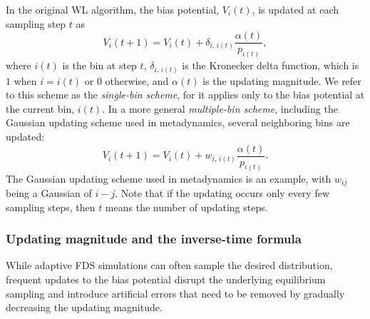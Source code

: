 \documentclass[reprint, superscriptaddress, floatfix]{revtex4-1}
\begin{document}
%
In the original WL algorithm\cite{wang2001, *wang2001pre},
the bias potential, $V_i(t)$, is updated
at each sampling step $t$ as
%
\begin{equation}
  V_i(t+1)
  =
  V_i(t)
  +
  \delta_{i, \, i(t)}
  \frac{ \alpha(t) } { p_{i(t)} }
  ,
\label{eq:wl_update}
\end{equation}
%
where $i(t)$ is the bin at step $t$,
$\delta_{i, \, i(t)}$ is the Kronecker delta function,
which is $1$ when $i = i(t)$ or $0$ otherwise,
and $\alpha(t)$ is the updating magnitude.
%
We refer to this scheme as the \emph{single-bin scheme},
for it applies only to the bias potential
at the current bin, $i(t)$.
%
In a more general \emph{multiple-bin scheme},
including the Gaussian updating scheme
used in metadynamics,
several neighboring bins are updated:
%
\begin{equation}
  V_i(t+1)
  =
  V_i(t)
  +
  w_{i, \, i(t)}
  \frac{ \alpha(t) }
       { p_{i(t)} }
  .
  \label{eq:mbin_update}
\end{equation}
%
The Gaussian updating scheme used in metadynamics
is an example, with $w_{ij}$ being a Gaussian of $i-j$.
%
Note that if the updating occurs
only every few sampling steps,
then $t$ means the number of updating steps.



\subsubsection{Updating magnitude and the inverse-time formula}



While adaptive FDS simulations
can often sample the desired distribution,
frequent updates to the bias potential
disrupt the underlying equilibrium sampling
and introduce artificial errors that need to be
removed by gradually decreasing the updating magnitude\cite{
  belardinelli2007, *belardinelli2007jcp, *belardinelli2008, *belardinelli2016,
  zhou2005, morozov2007, zhou2008,
  laio2005, bussi2006, poulain2006, liang2007,
  crespo2010, *atchade2011, *fort2015}.
%
\end{document}
